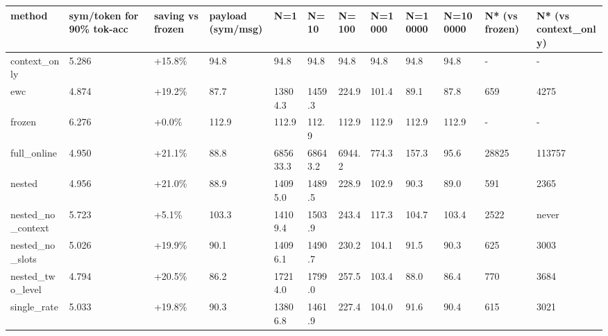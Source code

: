 \begin{tabular}{llllllllllll}
\hline
method & sym/token for 90\% tok-acc & saving vs frozen & payload (sym/msg) & N=1 & N=10 & N=100 & N=1000 & N=10000 & N=100000 & N* (vs frozen) & N* (vs context\_only) \\
\hline
context\_only & 5.286 & +15.8\% & 94.8 & 94.8 & 94.8 & 94.8 & 94.8 & 94.8 & 94.8 & - & - \\
ewc & 4.874 & +19.2\% & 87.7 & 13804.3 & 1459.3 & 224.9 & 101.4 & 89.1 & 87.8 & 659 & 4275 \\
frozen & 6.276 & +0.0\% & 112.9 & 112.9 & 112.9 & 112.9 & 112.9 & 112.9 & 112.9 & - & - \\
full\_online & 4.950 & +21.1\% & 88.8 & 685633.3 & 68643.2 & 6944.2 & 774.3 & 157.3 & 95.6 & 28825 & 113757 \\
nested & 4.956 & +21.0\% & 88.9 & 14095.0 & 1489.5 & 228.9 & 102.9 & 90.3 & 89.0 & 591 & 2365 \\
nested\_no\_context & 5.723 & +5.1\% & 103.3 & 14109.4 & 1503.9 & 243.4 & 117.3 & 104.7 & 103.4 & 2522 & never \\
nested\_no\_slots & 5.026 & +19.9\% & 90.1 & 14096.1 & 1490.7 & 230.2 & 104.1 & 91.5 & 90.3 & 625 & 3003 \\
nested\_two\_level & 4.794 & +20.5\% & 86.2 & 17214.0 & 1799.0 & 257.5 & 103.4 & 88.0 & 86.4 & 770 & 3684 \\
single\_rate & 5.033 & +19.8\% & 90.3 & 13806.8 & 1461.9 & 227.4 & 104.0 & 91.6 & 90.4 & 615 & 3021 \\
\hline
\end{tabular}
